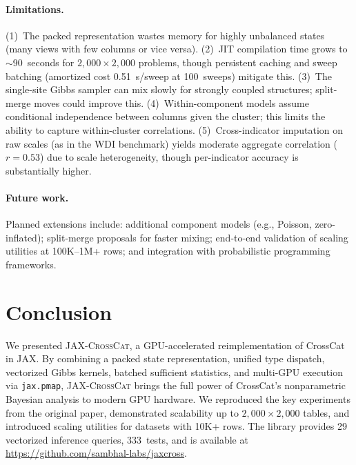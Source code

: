 \documentclass[11pt]{article}
\newcommand{\jaxcc}{\textsc{JAX-CrossCat}}
\begin{document}
\paragraph{Limitations.} (1)~The packed representation wastes memory for
highly unbalanced states (many views with few columns or vice versa).
(2)~JIT compilation time grows to ${\sim}$90~seconds for
$2{,}000 \times 2{,}000$ problems, though persistent caching and
sweep batching (amortized cost 0.51~s/sweep at 100~sweeps) mitigate
this. (3)~The single-site Gibbs sampler can mix slowly for strongly
coupled structures; split-merge moves \citep{jain2004split} could
improve this. (4)~Within-component models assume conditional independence
between columns given the cluster; this limits the ability to capture
within-cluster correlations. (5)~Cross-indicator imputation on raw
scales (as in the WDI benchmark) yields moderate aggregate correlation
($r = 0.53$) due to scale heterogeneity, though per-indicator accuracy
is substantially higher.

\paragraph{Future work.} Planned extensions include: additional component
models (e.g., Poisson, zero-inflated); split-merge proposals for faster
mixing; end-to-end validation of scaling utilities at 100K--1M+ rows;
and integration with probabilistic programming frameworks.

\section{Conclusion}

We presented \jaxcc{}, a GPU-accelerated reimplementation of CrossCat in
JAX. By combining a packed state representation, unified type dispatch,
vectorized Gibbs kernels, batched sufficient statistics, and multi-GPU
execution via \texttt{jax.pmap}, \jaxcc{} brings the full power of
CrossCat's nonparametric Bayesian analysis to modern GPU hardware. We
reproduced the key experiments from the original paper, demonstrated
scalability up to $2{,}000 \times 2{,}000$ tables, and introduced scaling
utilities for datasets with 10K+ rows. The library provides 29
vectorized inference queries, 333~tests, and is available at
\url{https://github.com/sambhal-labs/jaxcross}.

\end{document}
